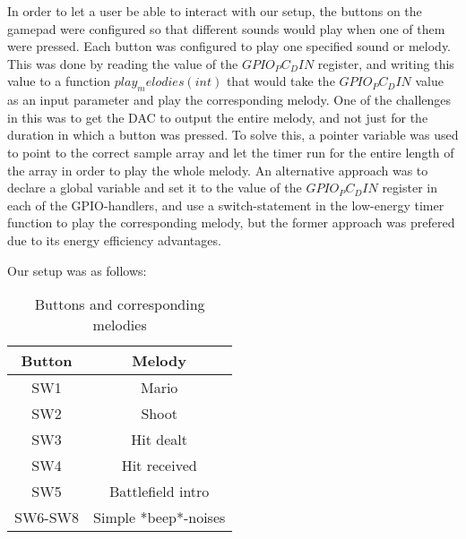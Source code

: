 
In order to let a user be able to interact with our setup, the buttons on the gamepad were configured so that different sounds would play when one of them were pressed. Each button was configured to play one specified sound or melody. This was done by reading the value of the $GPIO_PC_DIN$ register, and writing this value to a function $play_melodies(int)$ that would take the $GPIO_PC_DIN$ value as an input parameter and play the corresponding melody. One of the challenges in this was to get the DAC to output the entire melody, and not just for the duration in which a button was pressed. To solve this, a pointer variable was used to point to the correct sample array and let the timer run for the entire length of the array in order to play the whole melody. An alternative approach was to declare a global variable and set it to the value of the $GPIO_PC_DIN$ register in each of the GPIO-handlers, and use a switch-statement in the low-energy timer function to play the corresponding melody, but the former approach was prefered due to its energy efficiency advantages.

Our setup was as follows:

\begin{table}[ht]
\caption{Buttons and corresponding melodies}
\centering
\begin{tabular}{c c}
\hline
\hline %
Button & Melody \\ [0.5ex]
\hline
SW1 & Mario \\
SW2 & Shoot \\
SW3 & Hit dealt \\
SW4 & Hit received \\
SW5 & Battlefield intro \\
SW6-SW8 & Simple *beep*-noises \\
\hline
\end{tabular}
\label{table:nonlin}
\end{table}